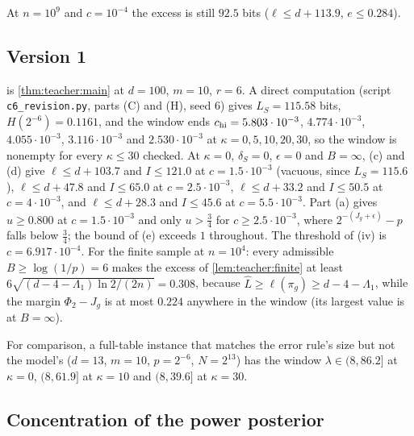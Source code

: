 \noindent At $n=10^9$ and $c=10^{-4}$ the excess is still $92.5$ bits ($\ell\le d+113.9$, $e\le0.284$).

\subsection{Version 1}\label{app:teacher:version1}

 is \cref{thm:teacher:main} at $d=100$, $m=10$, $r=6$. A direct computation (script \texttt{c6\_\allowbreak{}revision.py}, parts (C) and (H), seed 6) gives $L_S=115.58$ bits, $H(2^{-6})=0.1161$, and the window ends $c_{\rm hi}=5.803\cdot10^{-3}$, $4.774\cdot10^{-3}$, $4.055\cdot10^{-3}$, $3.116\cdot10^{-3}$ and $2.530\cdot10^{-3}$ at $\kappa=0,5,10,20,30$, so the window is nonempty for every $\kappa\le30$ checked. At $\kappa=0$, $\delta_S=0$, $\epsilon=0$ and $B=\infty$, (c) and (d) give $\ell\le d+103.7$ and $I\le121.0$ at $c=1.5\cdot10^{-3}$ (vacuous, since $L_S=115.6$), $\ell\le d+47.8$ and $I\le65.0$ at $c=2.5\cdot10^{-3}$, $\ell\le d+33.2$ and $I\le50.5$ at $c=4\cdot10^{-3}$, and $\ell\le d+28.3$ and $I\le45.6$ at $c=5.5\cdot10^{-3}$. Part (a) gives $u\ge0.800$ at $c=1.5\cdot10^{-3}$ and only $u>\frac34$ for $c\ge2.5\cdot10^{-3}$, where $2^{-(J_g+\epsilon)}-p$ falls below $\frac34$; the bound of (e) exceeds $1$ throughout. The threshold of (iv) is $c=6.917\cdot10^{-4}$. For the finite sample at $n=10^4$: every admissible $B\ge\log(1/p)=6$ makes the excess of \cref{lem:teacher:finite} at least $6\sqrt{(d-4-\Lambda_1)\ln2/(2n)}=0.308$, because $\hat L\ge\ell(\pi_g)\ge d-4-\Lambda_1$, while the margin $\Phi_2-J_g$ is at most $0.224$ anywhere in the window (its largest value is at $B=\infty$).

For comparison, a full-table instance that matches the error rule's size but not the model's ($d=13$, $m=10$, $p=2^{-6}$, $N=2^{13}$) has the window $\lambda\in(8,86.2]$ at $\kappa=0$, $(8,61.9]$ at $\kappa=10$ and $(8,39.6]$ at $\kappa=30$.

\subsection{Concentration of the power posterior}\label{app:teacher:concentration}

